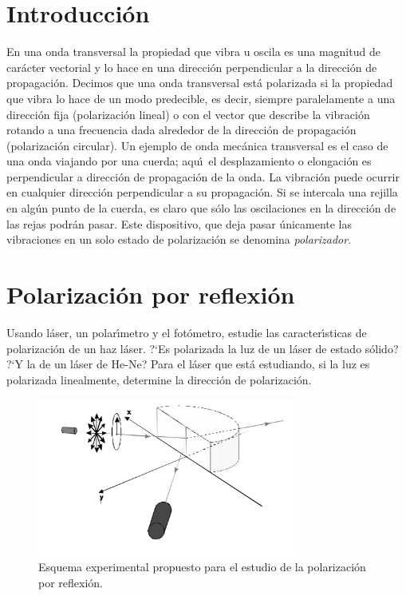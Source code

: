\documentclass[laboratorio]{guia}
\begin{document}
\maketitle

\section{Introducci\'on}
En una onda transversal la propiedad que vibra u oscila es una magnitud de 
car\'acter vectorial y lo hace en una direcci\'on perpendicular a la 
direcci\'on de propagaci\'on. Decimos que una onda transversal est\'a 
polarizada si la propiedad que vibra lo hace de un modo predecible, es decir,
siempre paralelamente a una direcci\'on fija (polarizaci\'on lineal) o con el
vector que describe la vibraci\'on rotando a una frecuencia dada alrededor de
la direcci\'on de propagaci\'on (polarizaci\'on circular). Un ejemplo de onda
mec\'anica transversal es el caso de una onda viajando por una cuerda; aqu\'\i\
el desplazamiento o elongaci\'on es perpendicular a direcci\'on de 
propagaci\'on de la onda. La vibraci\'on puede ocurrir en cualquier direcci\'on
perpendicular a su propagaci\'on. Si se intercala una rejilla en alg\'un punto
de la cuerda, es claro que s\'olo las oscilaciones en la direcci\'on de las 
rejas podr\'an pasar. Este dispositivo, que deja pasar \'unicamente las 
vibraciones en un solo estado de polarizaci\'on se denomina {\it polarizador}.


\section{Polarizaci\'on por reflexi\'on}

Usando l\'aser, un polar\'\i metro y el fot\'ometro, estudie las 
caracter\'\i sticas de polarizaci\'on de un haz l\'aser. ?`Es polarizada la
luz de un l\'aser de estado s\'olido? ?`Y la de un l\'aser de He-Ne? Para el
l\'aser que est\'a estudiando, si la luz es polarizada linealmente, determine
la direcci\'on de polarizaci\'on.

\begin{figure}[htb]
    \centering
    \includegraphics[width=8.5cm]{LG12--001.png}
    \caption{Esquema experimental propuesto para el estudio de la polarizaci\'on
    por reflexi\'on.}
    \label{fig:2}
\end{figure}
\end{document}
